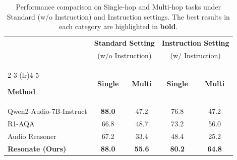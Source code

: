 \documentclass{article}
\begin{document}
\begin{table}[h]
    \centering
    \caption{Performance comparison on Single-hop and Multi-hop tasks under Standard (w/o Instruction) and Instruction settings. The best results in each category are highlighted in \textbf{bold}.}
    \label{tab:main_results}
    
    \setlength{\tabcolsep}{8pt} 
    \begin{tabular}{lcccc}
        \toprule
         & \multicolumn{2}{c}{\textbf{Standard Setting}} & \multicolumn{2}{c}{\textbf{Instruction Setting}} \\
         & \multicolumn{2}{c}{(w/o Instruction)} & \multicolumn{2}{c}{(w/ Instruction)} \\
        \cmidrule(lr){2-3} \cmidrule(lr){4-5} %
        
        \textbf{Method} & \textbf{Single} & \textbf{Multi} & \textbf{Single} & \textbf{Multi} \\
        \midrule
        
        Qwen2-Audio-7B-Instruct & \textbf{88.0} & 47.2 & 76.8 & 47.2 \\
        R1-AQA                  & 66.8 & 48.7 & 73.2 & 56.0 \\
        Audio Reasoner          & 67.2 & 33.4 & 48.4 & 25.2 \\
        \midrule %
        
        \textbf{Resonate (Ours)} & \textbf{88.0} & \textbf{55.6} & \textbf{80.2} & \textbf{64.8} \\
        \bottomrule
    \end{tabular}
\end{table}
\end{document}
